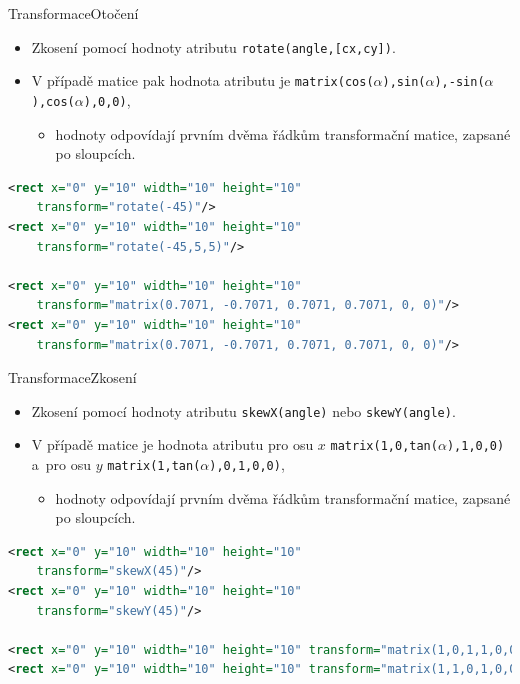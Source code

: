 \begin{frame}[t,fragile]{Transformace}{Otočení}
    \begin{itemize}
        \item Zkosení pomocí hodnoty atributu \texttt{rotate(angle,[cx,cy])}.
        \item V případě matice pak hodnota atributu je \texttt{matrix(cos($\alpha$),sin($\alpha$),-sin($\alpha$),cos($\alpha$),0,0)},
        \begin{itemize}
            \item hodnoty odpovídají prvním dvěma řádkům transformační matice, zapsané po sloupcích. 
        \end{itemize}
    \end{itemize}
    
    \begin{lstlisting}[language=XML,basicstyle={\small\ttfamily}]
<rect x="0" y="10" width="10" height="10" 
    transform="rotate(-45)"/>
<rect x="0" y="10" width="10" height="10" 
    transform="rotate(-45,5,5)"/>

<rect x="0" y="10" width="10" height="10" 
    transform="matrix(0.7071, -0.7071, 0.7071, 0.7071, 0, 0)"/>
<rect x="0" y="10" width="10" height="10" 
    transform="matrix(0.7071, -0.7071, 0.7071, 0.7071, 0, 0)"/>
    \end{lstlisting}
\end{frame}

\begin{frame}[t,fragile]{Transformace}{Zkosení}
    \begin{itemize}
        \item Zkosení pomocí hodnoty atributu \texttt{skewX(angle)} nebo \texttt{skewY(angle)}.
        \item V případě matice je hodnota atributu pro osu $x$ \texttt{matrix(1,0,tan($\alpha$),1,0,0)}\\
              a~pro osu $y$ \texttt{matrix(1,tan($\alpha$),0,1,0,0)},
        \begin{itemize}
            \item hodnoty odpovídají prvním dvěma řádkům transformační matice, zapsané po sloupcích. 
        \end{itemize}
    \end{itemize}
    
    \begin{lstlisting}[language=XML,basicstyle={\small\ttfamily}]
<rect x="0" y="10" width="10" height="10" 
    transform="skewX(45)"/>
<rect x="0" y="10" width="10" height="10" 
    transform="skewY(45)"/>

<rect x="0" y="10" width="10" height="10" transform="matrix(1,0,1,1,0,0)"/>
<rect x="0" y="10" width="10" height="10" transform="matrix(1,1,0,1,0,0)"/>
    \end{lstlisting}
\end{frame}